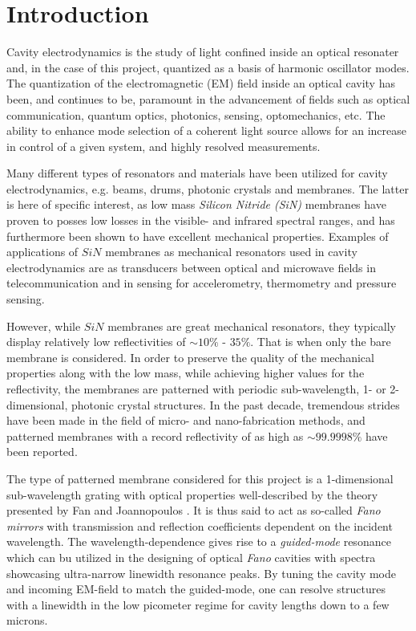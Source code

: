 \newpage
\section{Introduction}

Cavity electrodynamics\cite{Haroche} is the study of light confined inside an optical resonater and, in the case of this project, quantized as a basis of harmonic oscillator modes\cite{Sakurai}. The quantization of the electromagnetic (EM) field inside an optical cavity has been, and continues to be, paramount in the advancement of fields such as optical communication, quantum optics, photonics, sensing, optomechanics\cite{Monsel,Sankey}, etc. The ability to enhance mode selection of a coherent light source allows for an increase in control of a given system, and highly resolved measurements\cite{Vahala}.

Many different types of resonators and materials have been utilized for cavity electrodynamics, e.g. beams, drums, photonic crystals and membranes\cite{Thompson,Jayich}. The latter is here of specific interest, as low mass \emph{Silicon Nitride (SiN)} membranes\cite{Wilson} have proven to posses low losses in the visible- and infrared spectral ranges\cite{Land}, and has furthermore been shown to have excellent mechanical properties\cite{Seis,Cupertino}. Examples of applications of $SiN$ membranes as mechanical resonators used in cavity electrodynamics are as transducers between optical and microwave fields in telecommunication\cite{Bagci,Andrews} and in sensing for accelerometry\cite{Chowdhury,Manley}, thermometry\cite{Ferreiro-Vila,Zhang,Nair_thesis} and pressure sensing\cite{Naserbakht,Al-Sumaidae,Hornig,Salimi}. 

However, while $SiN$ membranes are great mechanical resonators, they typically display relatively low reflectivities of $\sim 10\%$ - $35\%$. That is when only the bare membrane is considered. In order to preserve the quality of the mechanical properties along with the low mass, while achieving higher values for the reflectivity, the membranes are patterned with periodic sub-wavelength, 1- or 2-dimensional, photonic crystal structures\cite{Kemiktarak,Kemiktarak2,Bui,Norte,Reinhardt,Chen,Zhou}. In the past decade, tremendous strides have been made in the field of micro- and nano-fabrication methods, and patterned membranes with a record reflectivity of as high as $\sim 99.9998\%$ have been reported\cite{Xu,Sang,Enzian}.

The type of patterned membrane considered for this project is a 1-dimensional sub-wavelength grating with optical properties well-described by the theory presented by Fan and Joannopoulos \cite{Fan-Joannopoulos-guided-mode-resonance,Fan-Joannopoulos-fano-resonance}. It is thus said to act as so-called \emph{Fano mirrors} with transmission and reflection coefficients dependent on the incident wavelength. The wavelength-dependence gives rise to a \emph{guided-mode} resonance which can bu utilized in the designing of optical \emph{Fano} cavities with spectra showcasing ultra-narrow linewidth resonance peaks\cite{Mitra,Manjeshwar}. By tuning the cavity mode and incoming EM-field to match the guided-mode, one can resolve structures with a linewidth in the low picometer regime for cavity lengths down to a few microns. 


